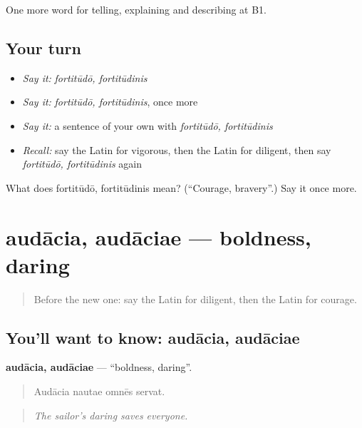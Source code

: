 \begin{grammarlens}[title={What you've built}]
One more word for telling, explaining and describing at B1.
\end{grammarlens}

\subsection*{Your turn}
\begin{itemize}
\raggedright
  \item \emph{Say it:} \emph{fortitūdō, fortitūdinis}
  \item \emph{Say it:} \emph{fortitūdō, fortitūdinis}, once more
  \item \emph{Say it:} a sentence of your own with \emph{fortitūdō, fortitūdinis}
  \item \emph{Recall:} say the Latin for vigorous, then the Latin for diligent, then say \emph{fortitūdō, fortitūdinis} again
\end{itemize}

\begin{tcolorbox}[breakable,colback=teal!4,colframe=teal!35!black,title={Before you move on}]
What does fortitūdō, fortitūdinis mean? (\textquotedblleft{}Courage, bravery\textquotedblright{}.) Say it once more.
\end{tcolorbox}
\section[audācia, audāciae]{audācia, audāciae — boldness, daring}

\label{lesson:LA-C509-audacia}



\begin{quote}
Before the new one: say the Latin for diligent, then the Latin for courage.
\end{quote}

\subsection*{You'll want to know: audācia, audāciae}
\textbf{audācia, audāciae} — \textquotedblleft{}boldness, daring\textquotedblright{}.

\begin{quote}
Audācia nautae omnēs servat.
\end{quote}

\begin{quote}
\emph{The sailor's daring saves everyone.}
\end{quote}

